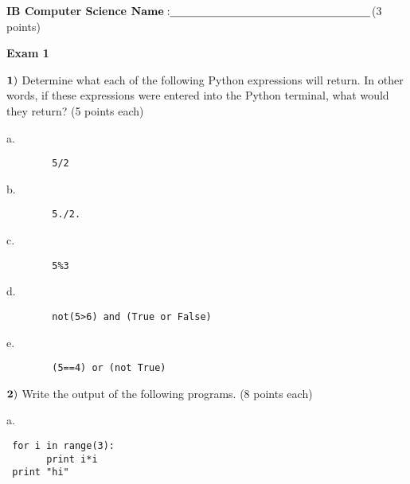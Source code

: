 \documentclass{article}
\begin{document}

\doublespacing
\textbf{IB Computer Science }                        %
 \hfill                             %
$ {\bf Name: } \underline{\hspace{2.5in}}$(3 points)

\begin{centering}
\vspace{1cm}
\textbf{Exam 1}\\
\end{centering}
\vspace{1cm}
 
$\bf{1)}$ Determine what each of the following Python expressions will return.  In other words, if these expressions were entered into the Python terminal, what would they return?
(5 points each)

\vspace{1cm}
  
 a.  
 \begin{verbatim}
 		5/2
 \end{verbatim}

 
 b.   \begin{verbatim}
 		5./2.
 \end{verbatim}
  \vspace{1cm}
 
 c.  
  \begin{verbatim}
 		5%3
 \end{verbatim}
 \vspace{1cm}
  
 d. 
  \begin{verbatim}
 		not(5>6) and (True or False) 
 \end{verbatim}
 \vspace{1cm}
 
 e. 
  \begin{verbatim}
 		(5==4) or (not True) 
 \end{verbatim}
 \vspace{1cm}

  \newpage
  
 $\bf{2)}$ Write the output of the following programs. (8 points each)
 
 \vspace{1cm}

  
 a.   \begin{verbatim}
 for i in range(3):
       print i*i
 print "hi"
 \end{verbatim}
 \vspace{1cm}
 
\end{document}

